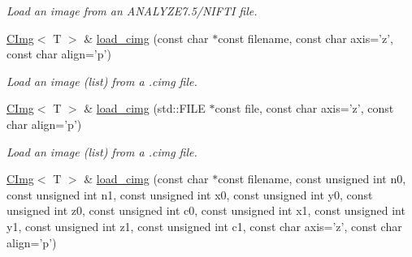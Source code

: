 \begin{DoxyCompactItemize}
\begin{DoxyCompactList}\small\item\em Load an image from an ANALYZE7.5/NIFTI file. \item\end{DoxyCompactList}\item 
\hypertarget{structcimg__library_1_1CImg_acdae64c0c93793df8b0a0b28a34d9694}{
\hyperlink{structcimg__library_1_1CImg}{CImg}$<$ T $>$ \& \hyperlink{structcimg__library_1_1CImg_acdae64c0c93793df8b0a0b28a34d9694}{load\_\-cimg} (const char $\ast$const filename, const char axis='z', const char align='p')}
\label{structcimg__library_1_1CImg_acdae64c0c93793df8b0a0b28a34d9694}

\begin{DoxyCompactList}\small\item\em Load an image (list) from a .cimg file. \item\end{DoxyCompactList}\item 
\hypertarget{structcimg__library_1_1CImg_acded7b441c1ab3c3f84e99a97e75cffe}{
\hyperlink{structcimg__library_1_1CImg}{CImg}$<$ T $>$ \& \hyperlink{structcimg__library_1_1CImg_acded7b441c1ab3c3f84e99a97e75cffe}{load\_\-cimg} (std::FILE $\ast$const file, const char axis='z', const char align='p')}
\label{structcimg__library_1_1CImg_acded7b441c1ab3c3f84e99a97e75cffe}

\begin{DoxyCompactList}\small\item\em Load an image (list) from a .cimg file. \item\end{DoxyCompactList}\item 
\hypertarget{structcimg__library_1_1CImg_aa4341e78148a620517b4fe2fc50f73d1}{
\hyperlink{structcimg__library_1_1CImg}{CImg}$<$ T $>$ \& \hyperlink{structcimg__library_1_1CImg_aa4341e78148a620517b4fe2fc50f73d1}{load\_\-cimg} (const char $\ast$const filename, const unsigned int n0, const unsigned int n1, const unsigned int x0, const unsigned int y0, const unsigned int z0, const unsigned int c0, const unsigned int x1, const unsigned int y1, const unsigned int z1, const unsigned int c1, const char axis='z', const char align='p')}
\label{structcimg__library_1_1CImg_aa4341e78148a620517b4fe2fc50f73d1}


\end{DoxyCompactItemize}
